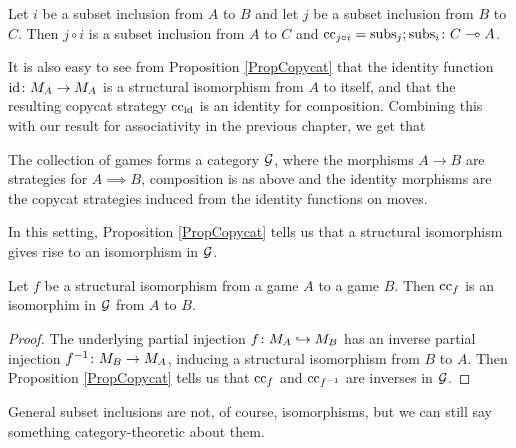 \documentclass[11pt]{report}
\begin{document}
\begin{corollary}
  Let $i$ be a subset inclusion from $A$ to $B$ and let $j$ be a subset inclusion from $B$ to $C$.  
  Then $j\circ i$ is a subset inclusion from $A$ to $C$ and $\operatorname{cc}_{j\circ i}=\operatorname{subs}_j;\operatorname{subs}_i\colon C \multimap A$.
\end{corollary}

It is also easy to see from Proposition \ref{PropCopycat} that the identity function $\operatorname{id}\colon M_A \to M_A$ is a structural isomorphism from $A$ to itself, and that the resulting copycat strategy $\operatorname{cc}_{\operatorname{id}}$ is an identity for composition.  
Combining this with our result for associativity in the previous chapter, we get that
\begin{theorem}
  The collection of games forms a category $\mathcal G$, where the morphisms $A \to B$ are strategies for $A\implies B$, composition is as above and the identity morphisms are the copycat strategies induced from the identity functions on moves.
\end{theorem}

In this setting, Proposition \ref{PropCopycat} tells us that a structural isomorphism gives rise to an isomorphism in $\mathcal G$.
\begin{proposition}
  Let $f$ be a structural isomorphism from a game $A$ to a game $B$.  
  Then $\operatorname{cc}_f$ is an isomorphim in $\mathcal G$ from $A$ to $B$.
\end{proposition}
\begin{proof}
  The underlying partial injection $f\colon M_A \hookrightarrow M_B$ has an inverse partial injection $f^{-1}\colon M_B \to M_A$, inducing a structural isomorphism from $B$ to $A$.  
  Then Proposition \ref{PropCopycat} tells us that $\operatorname{cc}_f$ and $\operatorname{cc}_{f^{-1}}$ are inverses in $\mathcal G$.
\end{proof}

General subset inclusions are not, of course, isomorphisms, but we can still say something category-theoretic about them.
\end{document}
